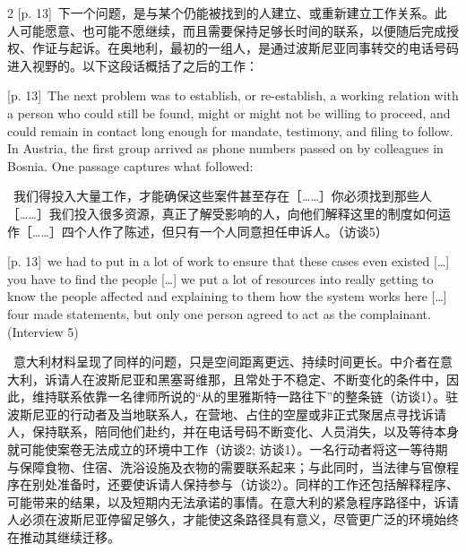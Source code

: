 \documentclass[10pt,a4paper]{article}
\begin{document}
\begin{paracol}{2}
{\scriptsize\color{gray} [p. 13]}\ 下一个问题，是与某个仍能被找到的人建立、或重新建立工作关系。此人可能愿意、也可能不愿继续，而且需要保持足够长时间的联系，以便随后完成授权、作证与起诉。在奥地利，最初的一组人，是通过波斯尼亚同事转交的电话号码进入视野的。以下这段话概括了之后的工作：\par
\switchcolumn
{\scriptsize\color{gray} [p. 13]}\ The next problem was to establish, or re-establish, a working relation with a person who could still be found, might or might not be willing to proceed, and could remain in contact long enough for mandate, testimony, and filing to follow. In Austria, the first group arrived as phone numbers passed on by colleagues in Bosnia. One passage captures what followed:\par
\switchcolumn*
{\scriptsize\color{gray} [p. 13]}\ 我们得投入大量工作，才能确保这些案件甚至存在［……］你必须找到那些人［……］我们投入很多资源，真正了解受影响的人，向他们解释这里的制度如何运作［……］四个人作了陈述，但只有一个人同意担任申诉人。（访谈5）\par
\switchcolumn
{\scriptsize\color{gray} [p. 13]}\ we had to put in a lot of work to ensure that these cases even existed […] you have to find the people […] we put a lot of resources into really getting to know the people affected and explaining to them how the system works here […] four made statements, but only one person agreed to act as the complainant. (Interview 5)\par
\switchcolumn*
{\scriptsize\color{gray} [p. 13]}\ 意大利材料呈现了同样的问题，只是空间距离更远、持续时间更长。中介者在意大利，诉请人在波斯尼亚和黑塞哥维那，且常处于不稳定、不断变化的条件中，因此，维持联系依靠一名律师所说的“从的里雅斯特一路往下”的整条链（访谈1）。驻波斯尼亚的行动者及当地联系人，在营地、占住的空屋或非正式聚居点寻找诉请人，保持联系，陪同他们赴约，并在电话号码不断变化、人员消失，以及等待本身就可能使案卷无法成立的环境中工作（访谈2; 访谈1）。一名行动者将这一等待期与保障食物、住宿、洗浴设施及衣物的需要联系起来；与此同时，当法律与官僚程序在别处准备时，还要使诉请人保持参与（访谈2）。同样的工作还包括解释程序、可能带来的结果，以及短期内无法承诺的事情。在意大利的紧急程序路径中，诉请人必须在波斯尼亚停留足够久，才能使这条路径具有意义，尽管更广泛的环境始终在推动其继续迁移。\par
\switchcolumn

\end{paracol}
\end{document}
